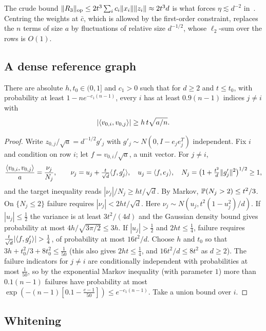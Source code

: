 \begin{remark}
The crude bound $\lVert R_3\rVert_{\mathrm{op}}\le2t^3\sum_ic_i\lVert x_i\rVert\lVert z_i\rVert\approx2t^3d$ is
what forces $\eta\lesssim d^{-2}$ in~\cite{Orig}. Centring the weights at
$\bar c$, which is allowed by the first-order constraint, replaces the $n$
terms of size $a$ by fluctuations of relative size $d^{-1/2}$, whose
$\ell_2$-sum over the rows is $O(1)$.
\end{remark}

\subsection{A dense reference graph}

\begin{lemma}\label{lem:mr-dense}
There are absolute $h,t_0\in(0,1]$ and $c_1>0$ such that for $d\ge2$ and
$t\le t_0$, with
probability at least $1-ne^{-c_1(n-1)}$, every $i$ has at least $0.9(n-1)$
indices $j\ne i$ with
\[
 |\langle v_{0,i},v_{0,j}\rangle|\ge h\,t\sqrt{a/n}.
\]
\end{lemma}

\begin{proof}
Write $z_{0,j}/\sqrt a=d^{-1/2}g'_j$ with $g'_j\sim N(0,I-e_je_j^T)$
independent. Fix $i$ and condition on row $i$; let $f=v_{0,i}/\sqrt a$, a unit
vector. For $j\ne i$,
\[
 \frac{\langle v_{0,i},v_{0,j}\rangle}{a}=\frac{\nu_j}{N_j},\qquad
 \nu_j=u_j+\tfrac t{\sqrt d}\langle f,g'_j\rangle,\quad u_j=\langle f,e_j\rangle,\quad
 N_j=\bigl(1+\tfrac{t^2}d\lVert g'_j\rVert^2\bigr)^{1/2}\ge1,
\]
and the target inequality reads $|\nu_j|/N_j\ge ht/\sqrt d$. By Markov,
$\mathbb P(N_j>2)\le t^2/3$. On $\{N_j\le2\}$ failure requires
$|\nu_j|<2ht/\sqrt d$. Here $\nu_j\sim N(u_j,t^2(1-u_j^2)/d)$. If $|u_j|\le\frac12$
the variance is at least $3t^2/(4d)$ and the Gaussian density bound gives
probability at most $4h/\sqrt{3\pi/2}\le3h$. If $|u_j|>\frac12$ and $2ht\le\frac14$,
failure requires $\frac t{\sqrt d}|\ip f{g'_j}|>\frac14$, of probability at most
$16t^2/d$. Choose $h$ and $t_0$ so that $3h+t_0^2/3+8t_0^2\le\frac1{50}$ (this also gives
$2ht\le\frac14$, and $16t^2/d\le8t^2$ as $d\ge2$). The
failure indicators for $j\ne i$ are conditionally independent with
probabilities at most $\frac1{50}$, so by the exponential Markov inequality
(with parameter $1$) more than $0.1(n-1)$ failures have probability at most
$\exp(-(n-1)[0.1-\frac{e-1}{50}])\le e^{-c_1(n-1)}$. Take a union bound over
$i$.
\end{proof}

\subsection{Whitening}

